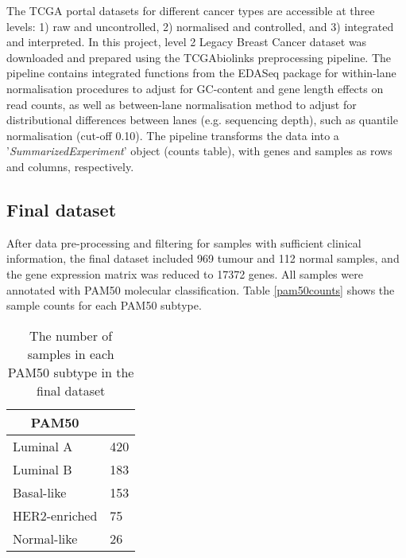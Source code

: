     The TCGA portal datasets for different cancer types are accessible at three levels: 1) raw and uncontrolled, 2) normalised and controlled, and 3) integrated and interpreted. In this project, level 2 Legacy Breast Cancer dataset was downloaded and prepared using the TCGAbiolinks preprocessing pipeline. The pipeline contains integrated functions from the EDASeq package \cite{risso2011gc} for within-lane normalisation procedures to adjust for GC-content and gene length effects on read counts, as well as between-lane normalisation method to adjust for distributional differences between lanes (e.g. sequencing depth), such as quantile normalisation (cut-off 0.10)\cite{Colaprico2016, PapaleoTCGAPackages}.  The pipeline transforms the data into a '\textit{SummarizedExperiment}' \cite{Huber2015OrchestratingBioconductor} object (counts table), with genes and samples as rows and columns, respectively. 
    
    
    \subsection{Final dataset}
    
    After data pre-processing and filtering for samples with sufficient clinical information, the final dataset included 969 tumour and 112 normal samples, and  the gene expression matrix was reduced to 17372 genes. 
    All samples were annotated with PAM50 molecular classification. Table \ref{pam50counts} shows the sample counts for each PAM50 subtype. 
    
    
                \begin{table}[!htbp]
                \centering
                \caption{The number of samples in each PAM50 subtype in the final dataset}
                \label{table:pam50counts}
                \begin{tabular}{ll}
                \multicolumn{1}{c}{\textbf{PAM50}} &  \\ \hline
                \multicolumn{1}{|l|}{Luminal A} & \multicolumn{1}{l|}{420} \\ \hline
                \multicolumn{1}{|l|}{Luminal B} & \multicolumn{1}{l|}{183} \\ \hline
                \multicolumn{1}{|l|}{Basal-like} & \multicolumn{1}{l|}{153} \\ \hline
                \multicolumn{1}{|l|}{HER2-enriched} & \multicolumn{1}{l|}{75} \\ \hline
                \multicolumn{1}{|l|}{Normal-like} & \multicolumn{1}{l|}{26} \\ \hline
                \end{tabular}
                \end{table}
                
